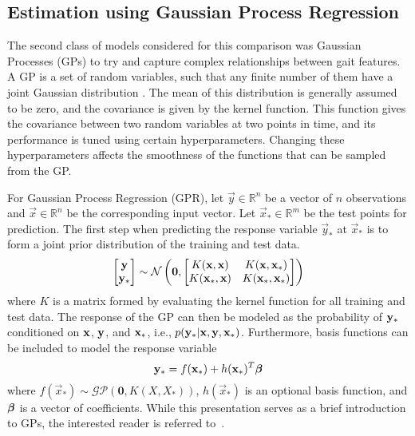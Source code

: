\subsection{Estimation using Gaussian Process Regression}\label{sec:GPR}

The second class of models considered for this comparison was Gaussian Processes (GPs) to try and capture complex relationships between gait features. A GP is a set of random variables, such that any finite number of them have a joint Gaussian distribution \cite{rasmussen2006gaussian}. The mean of this distribution is generally assumed to be zero, and the covariance is given by the kernel function. This function gives the covariance between two random variables at two points in time, and its performance is tuned using certain hyperparameters. Changing these hyperparameters affects the smoothness of the functions that can be sampled from the GP.

For Gaussian Process Regression (GPR), let $ \vec{y} \in \mathbb{R}^n $ be a vector of $ n $ observations and $ \vec{x} \in \mathbb{R}^n  $ be the corresponding input vector. Let $ \vec{x}_{*} \in \mathbb{R}^m$ be the test points for prediction. The first step when predicting the response variable $ \vec{y}_{*} $ at $ \vec{x}_{*} $ is to form a joint prior distribution of the training and test data. 
\[
	\begin{bmatrix}
		\y \\
		\y_{*}
	\end{bmatrix} \sim \mathcal{N} \left(\mathbf{0},%
	\begin{bmatrix}
		K(\x,\x) & K(\x,\x_{*}) \\
		K(\x_{*},\x) & K(\x_{*},\x_{*})
	\end{bmatrix}\right)
\]
where $ K $ is a matrix formed by evaluating the kernel function for all training and test data. The response of the GP can then be modeled as the probability of $ \mathbf{y}_{*} $ conditioned on $ \mathbf{x} $, $ \mathbf{y} $, and $ \mathbf{x}_{*} $, i.e., $ p(\mathbf{y}_{*}|\mathbf{x},\mathbf{y},\mathbf{x}_{*}) $. Furthermore, basis functions can be included to model the response variable
\[
	\mathbf{y}_{*} = f(\mathbf{x}_{*}) + h(\mathbf{x}_{*})^T \boldsymbol{\beta}
\]
where $ f(\vec{x}_{*}) \sim \mathcal{GP}(\mathbf{0},K(X,X_{*})) $, $ h(\vec{x}_*) $ is an optional basis function, and $ \boldsymbol{\beta} $ is a vector of coefficients. While this presentation serves as a brief introduction to GPs, the interested reader is referred to~\cite{rasmussen2006gaussian}.

